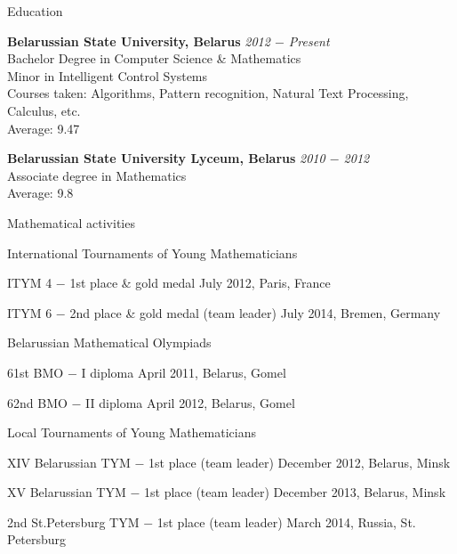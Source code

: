 \documentclass{resume} %
\begin{document}
\begin{rSection}{Education}

{\bf Belarussian State University, Belarus} \hfill {\em 2012 $-$ Present} \\ 
Bachelor Degree in Computer Science \& Mathematics \\
Minor in Intelligent Control Systems \smallskip \\
Courses taken: Algorithms, Pattern recognition, Natural Text Processing, Calculus, etc. \smallskip \\
Average: 9.47

{\bf Belarussian State University Lyceum, Belarus} \hfill {\em 2010 $-$ 2012} \\ 
Associate degree in Mathematics \\
Average: 9.8

\end{rSection}


\begin{rSection}{Mathematical activities}

\begin{rSubsection}{International Tournaments of Young Mathematicians}{}{}

\item ITYM 4 $-$ 1st place \& gold medal \hfill July 2012, Paris, France
\item ITYM 6 $-$ 2nd place \& gold medal (team leader) \hfill July 2014, Bremen, Germany

\end{rSubsection}

\begin{rSubsection}{Belarussian Mathematical Olympiads}{}{}

\item 61st BMO $-$ I diploma \hfill  April 2011, Belarus, Gomel
\item 62nd BMO $-$ II diploma \hfill April 2012, Belarus, Gomel
\end{rSubsection}


\begin{rSubsection}{Local Tournaments of Young Mathematicians}{}{}

\item XIV Belarussian TYM $-$ 1st place (team leader) \hfill December 2012, Belarus, Minsk
\item XV Belarussian TYM $-$ 1st place (team leader) \hfill December 2013, Belarus, Minsk
\item 2nd St.Petersburg TYM $-$ 1st place (team leader) \hfill March 2014, Russia, St. Petersburg
\end{rSubsection}

\end{rSection}
\end{document}
